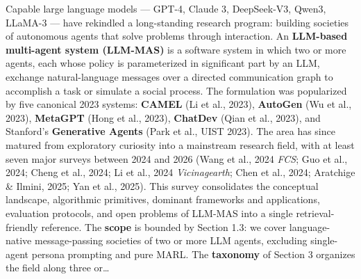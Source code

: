 Capable large language models --- GPT-4, Claude 3, DeepSeek-V3, Qwen3, LLaMA-3 --- have rekindled a long-standing research program: building societies of autonomous agents that solve problems through interaction. An \textbf{LLM-based multi-agent system (LLM-MAS)} is a software system in which two or more agents, each whose policy is parameterized in significant part by an LLM, exchange natural-language messages over a directed communication graph to accomplish a task or simulate a social process. The formulation was popularized by five canonical 2023 systems: \textbf{CAMEL} (Li et al., 2023), \textbf{AutoGen} (Wu et al., 2023), \textbf{MetaGPT} (Hong et al., 2023), \textbf{ChatDev} (Qian et al., 2023), and Stanford's \textbf{Generative Agents} (Park et al., UIST 2023). The area has since matured from exploratory curiosity into a mainstream research field, with at least seven major surveys between 2024 and 2026 (Wang et al., 2024 \emph{FCS}; Guo et al., 2024; Cheng et al., 2024; Li et al., 2024 \emph{Vicinagearth}; Chen et al., 2024; Aratchige \& Ilmini, 2025; Yan et al., 2025). This survey consolidates the conceptual landscape, algorithmic primitives, dominant frameworks and applications, evaluation protocols, and open problems of LLM-MAS into a single retrieval-friendly reference. The \textbf{scope} is bounded by Section 1.3: we cover language-native message-passing societies of two or more LLM agents, excluding single-agent persona prompting and pure MARL. The \textbf{taxonomy} of Section 3 organizes the field along three or\ldots{}
